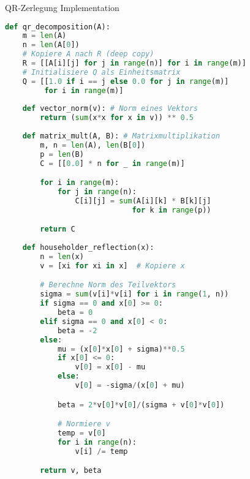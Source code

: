 \begin{examplecode}{QR-Zerlegung Implementation}
\begin{lstlisting}[language=Python, style=basesmol]
def qr_decomposition(A):
    m = len(A)
    n = len(A[0])
    # Kopiere A nach R (deep copy)
    R = [[A[i][j] for j in range(n)] for i in range(m)]
    # Initialisiere Q als Einheitsmatrix
    Q = [[1.0 if i == j else 0.0 for j in range(m)] 
         for i in range(m)]
    
    def vector_norm(v): # Norm eines Vektors
        return (sum(x*x for x in v)) ** 0.5
    
    def matrix_mult(A, B): # Matrixmultiplikation
        m, n = len(A), len(B[0])
        p = len(B)
        C = [[0.0] * n for _ in range(m)]

        for i in range(m):
            for j in range(n):
                C[i][j] = sum(A[i][k] * B[k][j] 
                             for k in range(p))

        return C
    
    def householder_reflection(x):
        n = len(x)
        v = [xi for xi in x]  # Kopiere x

        # Berechne Norm des Teilvektors
        sigma = sum(v[i]*v[i] for i in range(1, n))
        if sigma == 0 and x[0] >= 0:
            beta = 0
        elif sigma == 0 and x[0] < 0:
            beta = -2
        else:
            mu = (x[0]*x[0] + sigma)**0.5
            if x[0] <= 0:
                v[0] = x[0] - mu
            else:
                v[0] = -sigma/(x[0] + mu)

            beta = 2*v[0]*v[0]/(sigma + v[0]*v[0])

            # Normiere v
            temp = v[0]
            for i in range(n):
                v[i] /= temp

        return v, beta
\end{lstlisting}
\end{examplecode}

